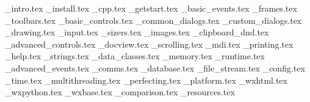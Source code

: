 \_intro.tex
%
\_install.tex
%
\_cpp.tex
%
\_getstart.tex
%
\_basic\_events.tex
%
\_frames.tex
%
\_toolbars.tex
%
\_basic\_controls.tex
%
\_common\_dialogs.tex
%
\_custom\_dialogs.tex
%
\_drawing.tex
%
\_input.tex
%
%
\_sizers.tex
%
\_images.tex
%
\_clipboard\_dnd.tex
%
\_advanced\_controls.tex
%
\_docview.tex
%
\_scrolling.tex
%
\_mdi.tex
%
\_printing.tex
%
\_help.tex
%
\_strings.tex
%
\_data\_classes.tex
%
\_memory.tex
%
\_runtime.tex
%
\_advanced\_events.tex
%
\_comms.tex
%
\_database.tex
%
\_file\_stream.tex
%
\_config.tex
%
\_time.tex
%
\_multithreading.tex
%
\_perfecting.tex
%
\_platform.tex
%
\_wxhtml.tex
%
\_wxpython.tex
%
\_wxbase.tex
%
\_comparison.tex
%
\_resources.tex

